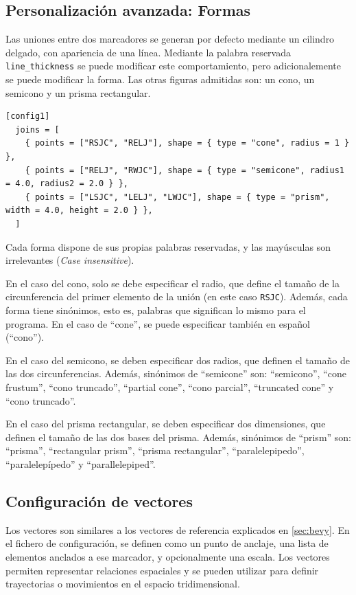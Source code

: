 \subsection{Personalización avanzada: Formas}

Las uniones entre dos marcadores se generan por defecto mediante un cilindro delgado, con apariencia de una línea. Mediante la palabra reservada \texttt{line\_thickness} se puede modificar este comportamiento, pero adicionalemente se puede modificar la forma. Las otras figuras admitidas son: un cono, un semicono y un prisma rectangular.

\begin{lstlisting}[style=mystyle, caption={Uso de formas}, label={lst:cfg-formas}] 
[config1]
  joins = [
    { points = ["RSJC", "RELJ"], shape = { type = "cone", radius = 1 } },
    { points = ["RELJ", "RWJC"], shape = { type = "semicone", radius1 = 4.0, radius2 = 2.0 } },
    { points = ["LSJC", "LELJ", "LWJC"], shape = { type = "prism", width = 4.0, height = 2.0 } },
  ]
\end{lstlisting}

Cada forma dispone de sus propias palabras reservadas, y las mayúsculas son irrelevantes (\textit{Case insensitive}). 

En el caso del cono, solo se debe especificar el radio, que define el tamaño de la circunferencia del primer elemento de la unión (en este caso \texttt{RSJC}). Además, cada forma tiene sinónimos, esto es, palabras que significan lo mismo para el programa. En el caso de ``cone'', se puede especificar también en español (``cono'').

En el caso del semicono, se deben especificar dos radios, que definen el tamaño de las dos circunferencias. Además, sinónimos de ``semicone'' son: ``semicono'', ``cone frustum'', ``cono truncado'', ``partial cone'', ``cono parcial'', ``truncated cone'' y ``cono truncado''.

En el caso del prisma rectangular, se deben especificar dos dimensiones, que definen el tamaño de las dos bases del prisma. Además, sinónimos de ``prism'' son: ``prisma'', ``rectangular prism'', ``prisma rectangular'', ``paralelepipedo'', ``paralelepípedo'' y ``parallelepiped''.

\subsection{Configuración de vectores}

Los vectores son similares a los vectores de referencia explicados en \autoref{sec:bevy}. En el fichero de configuración, se definen como un punto de anclaje, una lista de elementos anclados a ese marcador, y opcionalmente una escala. Los vectores permiten representar relaciones espaciales y se pueden utilizar para definir trayectorias o movimientos en el espacio tridimensional.

